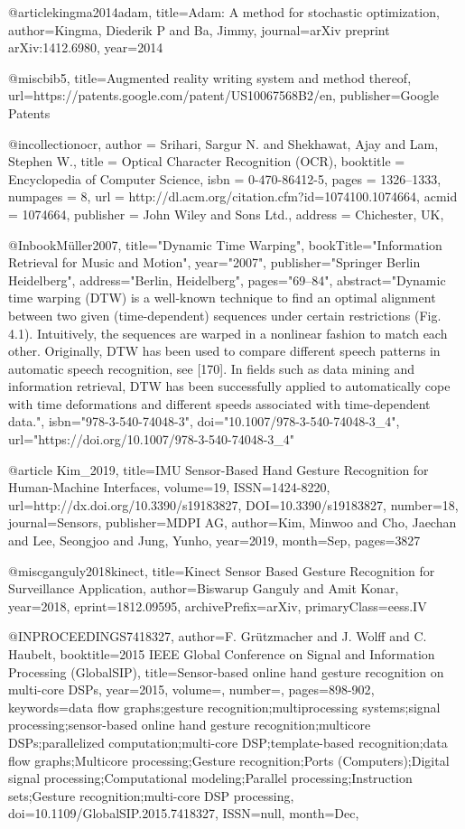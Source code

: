 @article{kingma2014adam,
  title={Adam: A method for stochastic optimization},
  author={Kingma, Diederik P and Ba, Jimmy},
  journal={arXiv preprint arXiv:1412.6980},
  year={2014}
}

@misc{bib5,
  title={Augmented reality writing system and method thereof},
  url={https://patents.google.com/patent/US10067568B2/en},
  publisher={Google Patents}
}

@incollection{ocr,
 author = {Srihari, Sargur N. and Shekhawat, Ajay and Lam, Stephen W.},
 title = {Optical Character Recognition (OCR)},
 booktitle = {Encyclopedia of Computer Science},
 isbn = {0-470-86412-5},
 pages = {1326--1333},
 numpages = {8},
 url = {http://dl.acm.org/citation.cfm?id=1074100.1074664},
 acmid = {1074664},
 publisher = {John Wiley and Sons Ltd.},
 address = {Chichester, UK},
} 

@Inbook{Müller2007,
title="Dynamic Time Warping",
bookTitle="Information Retrieval for Music and Motion",
year="2007",
publisher="Springer Berlin Heidelberg",
address="Berlin, Heidelberg",
pages="69--84",
abstract="Dynamic time warping (DTW) is a well-known technique to find an optimal alignment between two given (time-dependent) sequences under certain restrictions (Fig. 4.1). Intuitively, the sequences are warped in a nonlinear fashion to match each other. Originally, DTW has been used to compare different speech patterns in automatic speech recognition, see [170]. In fields such as data mining and information retrieval, DTW has been successfully applied to automatically cope with time deformations and different speeds associated with time-dependent data.",
isbn="978-3-540-74048-3",
doi="10.1007/978-3-540-74048-3_4",
url="https://doi.org/10.1007/978-3-540-74048-3_4"
}

@article{
  Kim_2019, 
  title={IMU Sensor-Based Hand Gesture Recognition for Human-Machine Interfaces}, 
  volume={19}, 
  ISSN={1424-8220}, 
  url={http://dx.doi.org/10.3390/s19183827}, 
  DOI={10.3390/s19183827}, 
  number={18}, 
  journal={Sensors}, 
  publisher={MDPI AG}, 
  author={Kim, Minwoo and Cho, Jaechan and Lee, Seongjoo and Jung, Yunho}, 
  year={2019}, 
  month={Sep},
   pages={3827}
}

@misc{ganguly2018kinect,
    title={Kinect Sensor Based Gesture Recognition for Surveillance Application},
    author={Biswarup Ganguly and Amit Konar},
    year={2018},
    eprint={1812.09595},
    archivePrefix={arXiv},
    primaryClass={eess.IV}
}

@INPROCEEDINGS{7418327,
author={F. {Grützmacher} and J. {Wolff} and C. {Haubelt}},
booktitle={2015 IEEE Global Conference on Signal and Information Processing (GlobalSIP)},
title={Sensor-based online hand gesture recognition on multi-core DSPs},
year={2015},
volume={},
number={},
pages={898-902},
keywords={data flow graphs;gesture recognition;multiprocessing systems;signal processing;sensor-based online hand gesture recognition;multicore DSPs;parallelized computation;multi-core DSP;template-based recognition;data flow graphs;Multicore processing;Gesture recognition;Ports (Computers);Digital signal processing;Computational modeling;Parallel processing;Instruction sets;Gesture recognition;multi-core DSP processing},
doi={10.1109/GlobalSIP.2015.7418327},
ISSN={null},
month={Dec},}

